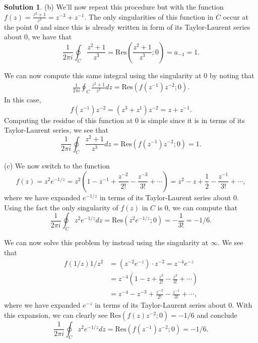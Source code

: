 \documentclass[12pt]{article}
\newcommand{\Res}{\text{Res}}
\theoremstyle{definition}
\newtheorem{sol}{Solution}
\theoremstyle{remark}
\begin{document}
\begin{sol}
\newpage 

(b) We'll now repeat this procedure but with the function $f(z) = \frac{z^2+1}{z^3} = z^{-3} + z^{-1}$. The only singularities of this function in $C$ occur at the point 0 and since this is already written in form of its Taylor-Laurent series about 0, we have that 
\begin{equation}
    \frac{1}{2\pi i} \oint_C  \frac{z^2+1}{z^3} = \Res\left(\frac{z^2+1}{z^3}; 0\right) = a_{-1} = 1.
\end{equation}

We can now compute this same integral using the singularity at 0 by noting that 
\begin{align}
    \frac{1}{2\pi i} \oint_{C} \frac{z^2+1}{z^3} dz = \Res(f(z^{-1})z^{-2};0).
\end{align}
In this case,
\begin{equation}
    f(z^{-1})z^{-2} = (z^{3} + z^{1}) z^{-2} = z + z^{-1}.
\end{equation}
Computing the residue of this function at 0 is simple since it is in terms of its Taylor-Laurent series, we see that 
\begin{equation}
    \frac{1}{2\pi i} \oint_{C} \frac{z^2+1}{z^3} dz = \Res(f(z^{-1})z^{-2};0)= 1.
\end{equation}

\newpage

(c) We now switch to the function 
\begin{equation}
    f(z) = z^2 e^{-1/z} = z^2 \left(1 - z^{-1} + \frac{z^{-2}}{2!} - \frac{z^{-3}}{3!} + \cdots   \right) = z^2 - z + \frac{1}{2} - \frac{z^{-1}}{3!} + \cdots,
\end{equation}
where we have expanded $e^{-1/z}$ in terms of its Taylor-Laurent series about 0. Using the fact the only singularity of $f(z)$ in $C$ is 0, we can compute that
\begin{equation}   
    \frac{1}{2\pi i} \oint_{C} z^2 e^{-1/z} dz = \Res( z^2 e^{-1/z} ;0) = - \frac{1}{3!} = -1/6 .
\end{equation}

We can now solve this problem by instead using the singularity at $\infty$. We see that
\begin{align}
    f(1/z) 1/z^2 &= (z^{-2} e^{-z} )\cdot z^{-2} = z^{-4}e^{-z}\\
                 &= z^{-4}\left(1 - z + \frac{z^2}{2!} - \frac{z^3}{3!} + \cdots \right)\\
                 &= z^{-4} - z^{-3} + \frac{z^{-2}}{2!} - \frac{z^{-1}}{3!} + \cdots,
\end{align}
where we have expanded $e^{-z}$ in terms of its Taylor-Laurent series about 0. With this expansion, we can clearly see $\Res(f(z)z^{-2};0) = -1/6$ and conclude
\begin{equation}
    \frac{1}{2\pi i} \oint_{C}  z^2 e^{-1/z}dz = \Res(f(z^{-1})z^{-2};0) = - 1/6.
\end{equation}
\end{sol}
\end{document}
